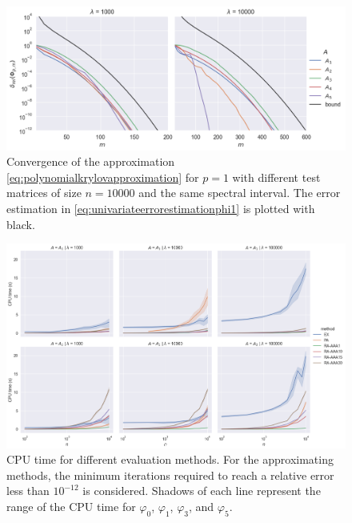 

\begin{figure}[h]
    \centering
    \includegraphics[width=\textwidth]{img/krylovapproximation/cnvg_matrices_PA_n10000.png}
    \caption{Convergence of the approximation \eqref{eq:polynomialkrylovapproximation}
    for $p=1$ with different test matrices of size $n=10000$ and the same spectral interval.
    The error estimation in \eqref{eq:univariateerrorestimationphi1} is plotted with black.}
    \label{fig:krylovapproximationmatrices}
\end{figure}

\begin{figure}[h]
    \centering
    \includegraphics[width=.9\textwidth]{img/krylovapproximation/cputime_methods.png}
    \caption{
        CPU time for different evaluation methods. For the approximating methods,
        the minimum iterations required to reach a relative error less than $10^{-12}$
        is considered. Shadows of each line represent the range of the CPU time for
        $\varphi_0$, $\varphi_1$, $\varphi_3$, and $\varphi_5$.
    }
    \label{fig:krylovapproximationcputime}
\end{figure}

